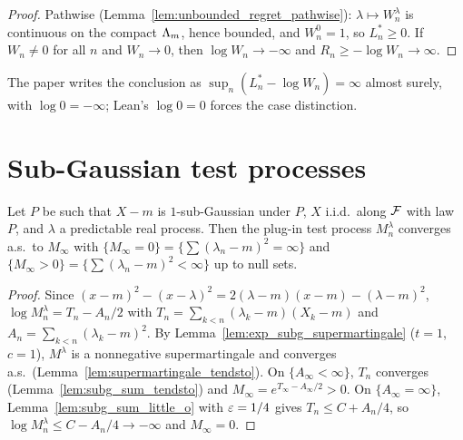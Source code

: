 \begin{proof}
  \leanok
  Pathwise (Lemma~\ref{lem:unbounded_regret_pathwise}): $\lambda \mapsto W^\lambda_n$ is
  continuous on the compact $\Lambda_m$, hence bounded, and
  $W^0_n = 1$, so $L^*_n \ge 0$. If $W_n \ne 0$ for all $n$ and $W_n \to 0$, then $\log W_n \to
  -\infty$ and $R_n \ge -\log W_n \to \infty$.
\end{proof}

\begin{remark}
  The paper writes the conclusion as $\sup_n (L^*_n - \log W_n) = \infty$ almost surely, with
  $\log 0 = -\infty$; Lean's $\log 0 = 0$ forces the case distinction.
\end{remark}

\section{Sub-Gaussian test processes}

\begin{theorem}
  \label{thm:sos_crit_subg_filtration}
  \leanok
  Let $P$ be such that $X - m$ is $1$-sub-Gaussian under $P$, $X$ i.i.d.\ along $\mathcal{F}$ with law $P$,
  and $\lambda$ a predictable real process. Then the plug-in test process $M^\lambda_n$ converges
  a.s.\ to $M_\infty$ with $\{M_\infty = 0\} = \{\sum (\lambda_n - m)^2 = \infty\}$ and
  $\{M_\infty > 0\} = \{\sum (\lambda_n - m)^2 < \infty\}$ up to null sets.
\end{theorem}

\begin{proof}
  \leanok
  Since $(x - m)^2 - (x - \lambda)^2 = 2(\lambda - m)(x - m) - (\lambda - m)^2$,
  $\log M^\lambda_n = T_n - A_n/2$ with $T_n = \sum_{k<n} (\lambda_k - m)(X_k - m)$ and $A_n =
  \sum_{k<n} (\lambda_k - m)^2$. By Lemma~\ref{lem:exp_subg_supermartingale} ($t = 1$, $c = 1$),
  $M^\lambda$ is a nonnegative supermartingale and converges a.s.\
  (Lemma~\ref{lem:supermartingale_tendsto}). On $\{A_\infty < \infty\}$, $T_n$ converges
  (Lemma~\ref{lem:subg_sum_tendsto}) and $M_\infty = e^{T_\infty - A_\infty/2} > 0$. On
  $\{A_\infty = \infty\}$, Lemma~\ref{lem:subg_sum_little_o} with $\varepsilon = 1/4$ gives $T_n \le C +
  A_n/4$, so $\log M^\lambda_n \le C - A_n/4 \to -\infty$ and $M_\infty = 0$.
\end{proof}

